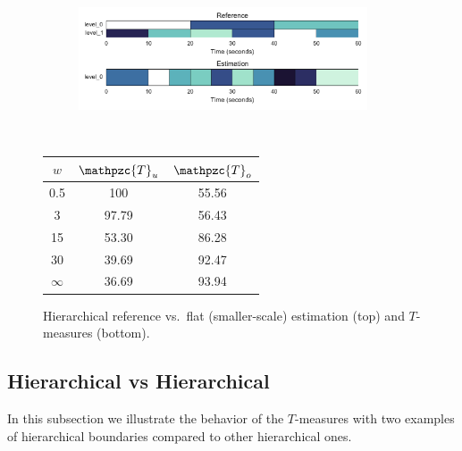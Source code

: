 \documentclass{article}
\def\shag{\ensuremath{\mathpzc{T}}}
\begin{document}
\begin{figure}[t]
  \centering
  \begin{subfigure}{0.5\textwidth}
    \centering
    \includegraphics[width=0.94\textwidth]{figs/hier-flatsmaller.pdf}
  \end{subfigure}%
  \\
  \begin{minipage}{0.5\textwidth}
    \centering
    \vspace{10pt}
    \begin{tabular}{|c|c|c|}
      \hline
      $w$       & $\shag_u$    & $\shag_o$      \\
      \hline
      0.5       & 100       & 55.56      \\     
      3         & 97.79     & 56.43      \\
      15        & 53.30     & 86.28    \\
      30        & 39.69     & 92.47    \\
      $\infty$  & 36.69     & 93.94    \\
      \hline
    \end{tabular}
  \end{minipage}
  \caption{Hierarchical reference vs.\ flat (smaller-scale) estimation (top) and $T$-measures (bottom).}
  \label{fig:hier-flatsmaller}
\end{figure}
\subsection{Hierarchical vs Hierarchical}

In this subsection we illustrate the behavior of the $T$-measures with two examples of hierarchical boundaries compared to other hierarchical ones.

\end{document}
